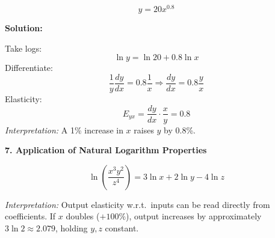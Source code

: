 \documentclass[12pt]{article}
\begin{document}
\[
y = 20x^{0.8}
\]

\textbf{Solution:}

Take logs:
\[
\ln y = \ln 20 + 0.8 \ln x
\]
Differentiate:
\[
\frac{1}{y}\frac{dy}{dx} = 0.8 \frac{1}{x} \Rightarrow \frac{dy}{dx} = 0.8\frac{y}{x}
\]
Elasticity:
\[
E_{yx} = \frac{dy}{dx}\cdot \frac{x}{y} = 0.8
\]
\textit{Interpretation:} A 1\% increase in \(x\) raises \(y\) by 0.8\%.

\vspace{1em}

\textbf{7. Application of Natural Logarithm Properties}

\[
\ln \left( \frac{x^3 y^2}{z^4} \right) = 3\ln x + 2\ln y - 4\ln z
\]

\textit{Interpretation:} Output elasticity w.r.t.\ inputs can be read directly from coefficients. If \(x\) doubles (\(+100\%\)), output increases by approximately \(3\ln 2 \approx 2.079\), holding \(y,z\) constant.

\vspace{1em}
\end{document}
